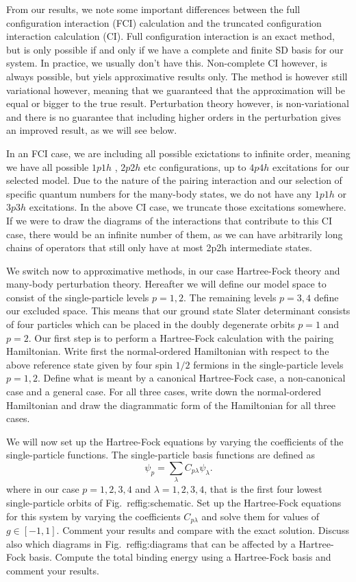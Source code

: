 \begin{prob}
From our results, we note some important differences between the full configuration interaction (FCI)
calculation and the truncated configuration interaction calculation (CI).
Full configuration interaction is an exact method, but is only
possible if and only if we have a complete and finite SD basis for our
system. In practice, we usually don't have this. Non-complete
CI however, is always possible, but yiels   approximative
results only. The method is however still variational however, meaning that we
guaranteed that the approximation will be equal or bigger to the true
result.
Perturbation theory however, is non-variational and there is no guarantee that including higher orders in the
perturbation gives an improved result, as we will see below.

In an FCI case, we are including all possible exictations to infinite
order, meaning we have all possible $1p1h$ , $2p2h$ etc configurations, up to $4p4h$
excitations for our selected model. Due to the nature of the pairing interaction and our selection
of specific quantum numbers for the many-body states, we do not have any $1p1h$ or $3p3h$ excitations.
In the above CI case, we truncate those excitations somewhere.
If we
were to draw the diagrams of the interactions that contribute to this
CI case, there would be an infinite number of them, as we can have
arbitrarily long chains of operators that still only have at most 2p2h
intermediate states.


We switch now to approximative methods, in our case Hartree-Fock
  theory and many-body perturbation theory. Hereafter we will define
  our model space to consist of the single-particle levels $p=1,2$.
  The remaining levels $p=3,4$ define our excluded space.  This means
  that our ground state Slater determinant consists of four particles
  which can be placed in the doubly degenerate orbits $p=1$ and $p=2$.
  Our first step is to perform a Hartree-Fock calculation with the
  pairing Hamiltonian.  Write first the normal-ordered Hamiltonian
  with respect to the above reference state given by four spin $1/2$
  fermions in the single-particle levels $p=1,2$. Define what is meant
  by a canonical Hartree-Fock case, a non-canonical case and a general
  case.  For all three cases, write down the normal-ordered
  Hamiltonian and draw the diagrammatic form of the Hamiltonian for all three cases.

We will now set up the Hartree-Fock equations by varying the
coefficients of the single-particle functions. The single-particle
basis functions are defined as
\[
\psi_p = \sum_{\lambda} C_{p\lambda}\psi_{\lambda}.
\]
where in our case $p=1,2,3,4$ and $\lambda=1,2,3,4$, that is the first
four lowest single-particle orbits of Fig.~ref{fig:schematic}.  Set
up the Hartree-Fock equations for this system by varying the
coefficients $C_{p\lambda}$ and solve them for values of $g\in
[-1,1]$.  Comment your results and compare with the exact
solution. Discuss also which diagrams in Fig.~ref{fig:diagrams} that
can be affected by a Hartree-Fock basis. Compute the total binding
energy using a Hartree-Fock basis and comment your results.



\end{prob}
